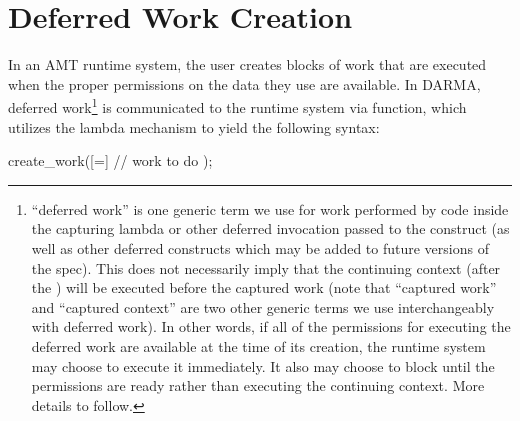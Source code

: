 \section{Deferred Work Creation}
\label{sec:deferred}
In an AMT \gls{runtime system}, the user creates blocks of work that
are executed when the proper permissions on the data they use are available.
In DARMA, \gls{deferred work}\footnote{``\Gls{deferred work}'' is one generic term we use for work
performed by code inside the capturing \gls{lambda} or other deferred invocation
passed to the  construct (as well as other deferred constructs which
may be added to future versions of the spec).  This does not necessarily imply
that the \gls{continuing context} (after the ) will be
executed before the \gls{captured work} (note that ``\gls{captured work}'' and
``\gls{captured context}'' are two other generic terms we use interchangeably
with \gls{deferred work}).  
In other words, if all of the permissions for executing the \gls{deferred work} are
available at the time of its creation, the \gls{runtime system} may choose to execute it
immediately.  It also may choose to block until the permissions are ready rather
than executing the \gls{continuing context}.  More details to follow.}
is communicated to the \gls{runtime system} via  function, which utilizes
the \CC{} \gls{lambda} mechanism to yield the following syntax:
\begin{CppCode}
  create_work([=]{
    // work to do
  });
\end{CppCode}

